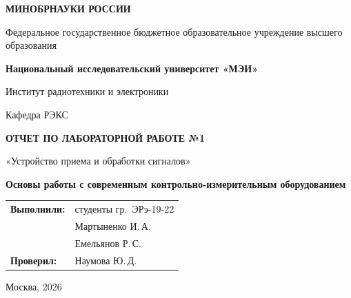 \begin{titlepage}
    \centering
    {\bfseries МИНОБРНАУКИ РОССИИ\par}
    Федеральное государственное бюджетное образовательное учреждение высшего образования \\
    {\bfseries Национальный исследовательский университет «МЭИ»\par}
    \vspace{1cm}
    Институт радиотехники и электроники\par
    Кафедра РЭКС\par
    \vspace{3cm}
    
    {\bfseries\large ОТЧЕТ ПО ЛАБОРАТОРНОЙ РАБОТЕ №1\par}
    \vspace{0.5cm}
    {\large «Устройство приема и обработки сигналов»\par}
    {\bfseries Основы работы с современным контрольно-измерительным оборудованием\par}
    
    \vspace{3.5cm}
 \vspace{1.5cm}
\noindent\hfill
\begin{tabular}{@{}ll@{}}
    \textbf{Выполнили:} & студенты гр.~ЭРэ-19-22 \\
                        & Мартыненко И.\,А. \\
                        & Емельянов Р.\,С. \\[0.4cm]
    \textbf{Проверил:}  & Наумова Ю.\,Д.
\end{tabular}   
    \vfill
    {Москва, 2026}
\end{titlepage}

